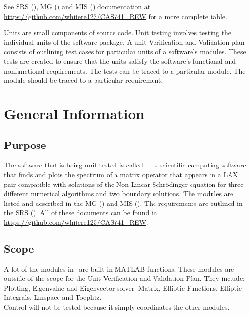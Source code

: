 \documentclass[12pt, titlepage]{article}
\begin{document}
See SRS (\cite{SRS}), MG (\cite{MG}) and MIS (\cite{MIS}) documentation at 
\url{https://github.com/whitere123/CAS741_REW} for a more complete table. 

\newpage


Units are small components of source code. Unit testing involves testing 
the individual units of the software package.  A unit Verification and 
Validation plan consists of outlining test cases for particular units of a 
software's modules. These tests are created to ensure that the units satisfy 
the software's functional and nonfunctional requirements. The tests can be 
traced to a particular module. The module should be traced to a particular 
requirement. 

\section{General Information}

\subsection{Purpose}

The software that is being unit tested is called \progname. \progname \ is 
scientific computing software that finds and plots the spectrum of a matrix 
operator that appears in a LAX pair compatible with solutions of the Non-Linear 
Schr\"{o}dinger equation for three different numerical algorithms and two 
boundary solutions. The modules are listed and described in the MG (\cite{MG}) 
and 
MIS (\cite{MIS}). The requirements are outlined in the SRS (\cite{SRS}). All of 
these documents can be 
found in \url{https://github.com/whitere123/CAS741_REW}. 

\subsection{Scope}

A lot of the modules in \progname \ are built-in MATLAB functions. These 
modules 
are outside of the scope for the Unit Verification and Validation Plan. They 
include: Plotting, Eigenvalue and Eigenvector solver, Matrix, Elliptic 
Functions, Elliptic Integrals, Linspace and Toeplitz.\\  
Control will not be tested because it simply coordinates the other modules.

\end{document}
